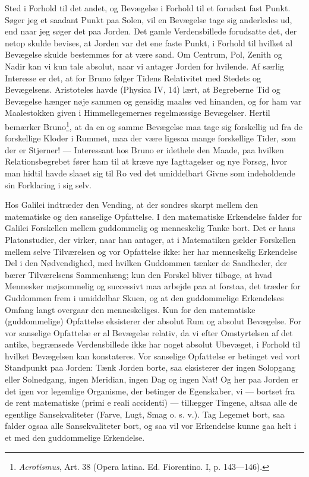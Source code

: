 \documentclass[12pt]{article}
\newcommand{\opage}[1]{\marginnote{\footnotesize\textit{[#1]}}}
\begin{document}
Sted i Forhold til det andet, og Bevægelse i Forhold til et forudsat fast
Punkt. Søger jeg et saadant Punkt paa Solen, vil en Bevægelse tage sig
anderledes ud, end naar jeg søger det paa Jorden. Det gamle Verdensbillede
forudsatte det, der netop skulde bevises, at Jorden var det ene faste Punkt,
i Forhold til hvilket al Bevægelse skulde bestemmes for at være sand. Om
Centrum, Pol, Zenith og Nadir kan vi kun tale absolut, naar vi antager Jorden
for hvilende. Af særlig Interesse er det, at for Bruno følger Tidens
Relativitet med Stedets og Bevægelsens. Aristoteles havde (Physica IV, 14)
lært, at Begreberne Tid og Bevægelse hænger nøje sammen og gensidig maales ved
hinanden, og for ham var Maalestokken given i Himmellegemernes regelmæssige
Bevægelser. Hertil bemærker Bruno\footnote{\textit{Acrotismus}, Art. 38
(Opera latina. Ed. Fiorentino. I, p. 143---146).}, at da en og samme Bevægelse
maa tage sig forskellig ud fra de forskellige Kloder i Rummet, maa der være
ligesaa mange forskellige Tider, som der er Stjerner! --- Interessant hos
Bruno er idethele den Maade, paa hvilken Relationsbegrebet fører ham til at
kræve nye Iagttagelser og nye Forsøg, hvor man hidtil havde slaaet sig til Ro
ved det umiddelbart Givne som indeholdende sin Forklaring i sig selv.

Hos Galilei indtræder den Vending, at der sondres skarpt mellem den
matematiske og den sanselige Opfattelse. I den matematiske Erkendelse falder
for Galilei Forskellen mellem guddommelig og menneskelig Tanke bort. Det er
hans Platonstudier, der virker, naar han antager, at i Matematiken gælder
Forskellen mellem selve Tilværelsen og vor Opfattelse ikke: her har
menneskelig Erkendelse Del i den Nødvendighed, med hvilken Guddommen
\opage{65} tænker de Sandheder, der bærer Tilværelsens Sammenhæng; kun den Forskel
bliver tilbage, at hvad Mennesker møjsommelig og successivt maa arbejde paa
at forstaa, det træder for Guddommen frem i umiddelbar Skuen, og at den
guddommelige Erkendelses Omfang langt overgaar den menneskeliges. Kun for den
matematiske (guddommelige) Opfattelse eksisterer der absolut Rum og absolut
Bevægelse. For vor sanselige Opfattelse er al Bevægelse relativ, da vi efter
Omstyrtelsen af det antike, begrænsede Verdensbillede ikke har noget absolut
Ubevæget, i Forhold til hvilket Bevægelsen kan konstateres. Vor sanselige
Opfattelse er betinget ved vort Standpunkt paa Jorden: \guillemotright Tænk
Jorden borte, saa eksisterer der ingen Solopgang eller Solnedgang, ingen
Meridian, ingen Dag og ingen Nat!\guillemotleft{} Og her paa Jorden er det
igen vor legemlige Organisme, der betinger de Egenskaber, vi --- bortset fra
de rent matematiske (primi e reali accidenti) --- tillægger Tingene, altsaa
alle de egentlige Sansekvaliteter (Farve, Lugt, Smag o. s. v.). Tag Legemet
bort, saa falder ogsaa alle Sansekvaliteter bort, og saa vil vor Erkendelse
kunne gaa helt i et med den guddommelige Erkendelse.
\end{document}
